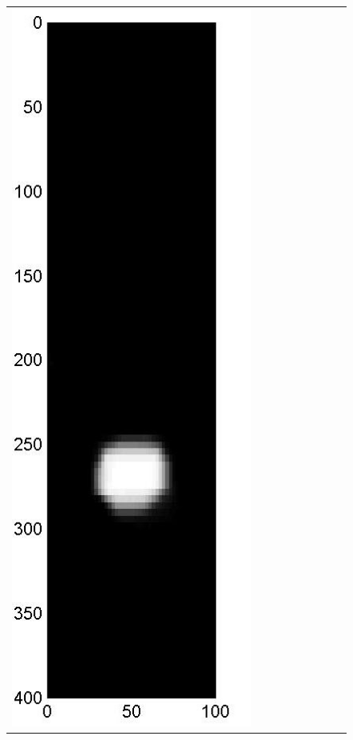 \documentclass[11pt]{article}
\begin{document}
\begin{figure}[!h]
\begin{center}
\begin{tabular}{|c|c|c|c|c|c|c|c|c|}
			\includegraphics[width=.9\iwidth]{figures/newFigs/noisy/resultsExp-6-mkTV}
			&

\end{tabular}
\end{center}
\end{figure}
\end{document}
